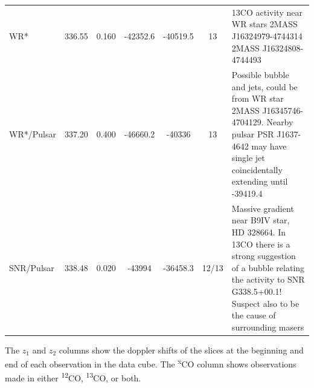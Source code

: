 \documentclass[a4paper, titlepage, oneside]{article}
\newcommand{\elem}[2]{\textsuperscript{#1}{#2}}
\begin{document}
\begin{table}[H]
\begin{tabular*}{\textwidth}{@{\extracolsep{\fill} } l *{5}{c} p{5cm}}
WR*             & 336.55 &  0.160  & -42352.6 & -40519.5 & 13 & 
                13CO activity near WR stars {2MASS J16324979-4744314} {2MASS J16324808-4744493} \\
WR*/Pulsar      & 337.20 &  0.400  & -46660.2 &  -40336  & 13 & 
                Possible bubble and jets, could be from WR star {2MASS J16345746-4704129}. Nearby pulsar {PSR J1637-4642} may have single jet coincidentally extending until -39419.4 \\
SNR/Pulsar      & 338.48 &  0.020  &  -43994  & -36458.3 & 12/13 & 
                Massive gradient near B9IV star, HD 328664. In 13CO there is a strong suggestion of a bubble relating the activity to SNR G338.5+00.1! Suspect also to be the cause of surrounding masers \\
\hline
\end{tabular*}
\label{tab:mopra-obs}
\end{table}
\vspace{-1em}
{\footnotesize The \(z_1\) and \(z_2\) columns show the doppler shifts of the slices at the beginning and end of each observation in the data cube. The \elem{x}{C}O column shows observations made in either \elem{12}{C}O, \elem{13}{C}O, or both.}
\end{document}
